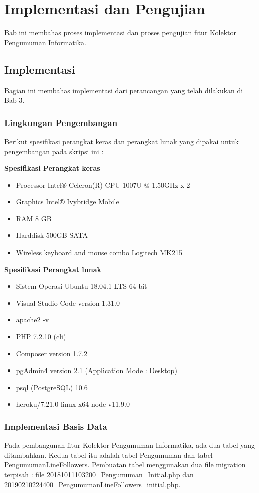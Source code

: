 
\chapter{Implementasi dan Pengujian}
\label{chap:implementasiDanPengujian}

Bab ini membahas proses implementasi dan proses pengujian fitur Kolektor Pengumuman Informatika.
\section{Implementasi}
Bagian ini membahas implementasi dari perancangan yang telah dilakukan di Bab 3.
\subsection{Lingkungan Pengembangan}
Berikut spesifikasi perangkat keras dan perangkat lunak yang dipakai untuk pengembangan pada skripsi ini :

\textbf{Spesifikasi Perangkat keras}
\begin{itemize}
\item Processor Intel® Celeron(R) CPU 1007U @ 1.50GHz x 2 
\item Graphics Intel® Ivybridge Mobile
\item RAM 8 GB
\item Harddisk 500GB SATA
\item Wireless keyboard and mouse combo Logitech MK215
\end{itemize}

\textbf{Spesifikasi Perangkat lunak}
\begin{itemize}
\item Sistem Operasi Ubuntu 18.04.1 LTS 64-bit
\item Visual Studio Code version 1.31.0
\item apache2 -v
\item PHP 7.2.10 (cli)
\item Composer version 1.7.2
\item pgAdmin4 version 2.1 (Application Mode : Desktop)
\item psql (PostgreSQL) 10.6
\item heroku/7.21.0 linux-x64 node-v11.9.0
\end{itemize}

\subsection{Implementasi Basis Data}
Pada pembangunan fitur Kolektor Pengumuman Informatika, ada dua tabel yang ditambahkan. Kedua tabel itu adalah tabel Pengumuman dan tabel PengumumanLineFollowers. Pembuatan tabel menggunakan dua file migration terpisah : file 20181011103200\_Pengumuman\_Initial.php dan 20190210224400\_PengumumanLineFollowers\_initial.php.

